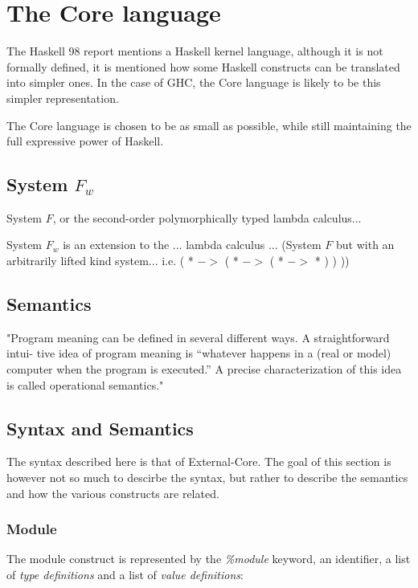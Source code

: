 
\chapter{The Core language}

The Haskell 98 report mentions a Haskell kernel language, although it is not
formally defined, it is mentioned how some Haskell constructs can be translated into
simpler ones. In the case of GHC, the Core language is likely to be this simpler 
representation.

The Core language is chosen to be as small as possible, while still maintaining 
the full expressive power of Haskell.

\section{System $F_w$}

System $F$, or the second-order polymorphically typed lambda calculus...

System $F_w$ is an extension to the ... lambda calculus ... 
(System $F$ but with an arbitrarily lifted kind system... i.e. ( * $->$ ( * $->$ ( * $->$ * ) ) ))


\section{Semantics}

"Program meaning can be defined in several different ways. A straightforward intui-
tive idea of program meaning is “whatever happens in a (real or model) computer when
the program is executed.” A precise characterization of this idea is called operational
semantics."



\section{Syntax and Semantics}



The syntax described here is that of External-Core. The goal of this section is
however not so much to descirbe the syntax, but rather to describe the semantics and 
how the various constructs are related.

\subsection{Module}

The module construct is represented by the \emph{\%module} keyword, an identifier,
a list of \emph{type definitions} and a list of \emph{value definitions}:

